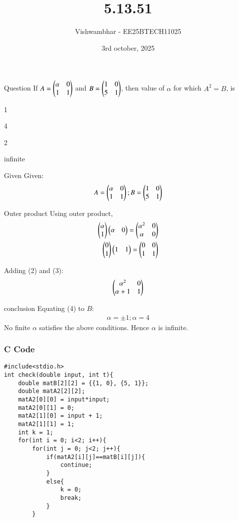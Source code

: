 \documentclass{beamer}
\title{5.13.51}
\date{3rd october, 2025}
\author{Vishwambhar - EE25BTECH11025}
\begin{document}
\frame{\titlepage}
\begin{frame}{Question}
If $A=\begin{pmatrix}\alpha&0\\1&1\end{pmatrix}$ and $B=\begin{pmatrix}1&0\\5&1\end{pmatrix}$, then value of $\alpha$ for which $A^2=B$, is
\begin{enumerate}
\begin{multicols}{2}
    \item 1
    \item 4
    \item 2
    \item infinite
\end{multicols}
\end{enumerate}\end{frame}

\begin{frame}{Given}
Given:
\begin{align}
    A = \begin{pmatrix}\alpha&0\\1&1\end{pmatrix};
    B = \begin{pmatrix}1&0\\5&1\end{pmatrix}
\end{align}
\end{frame}

\begin{frame}{Outer product}
Using outer product,
\begin{align}
    \begin{pmatrix}\alpha\\1\end{pmatrix}\begin{pmatrix}\alpha&0\end{pmatrix} = \begin{pmatrix}\alpha^2&0\\\alpha&0\end{pmatrix}\\
    \begin{pmatrix}0\\1\end{pmatrix}\begin{pmatrix}1&1\end{pmatrix} = \begin{pmatrix}0&0\\1&1\end{pmatrix}
\end{align}

Adding (2) and (3):
\begin{align}
    \begin{pmatrix}\alpha^2&0\\\alpha+1&1\end{pmatrix}
\end{align}
\end{frame}

\begin{frame}{conclusion}
Equating (4) to $B$:
\begin{align}
    \alpha = \pm1; \alpha = 4
\end{align}
No finite $\alpha$ satisfies the above conditions. Hence $\alpha$ is infinite.
\end{frame}

\begin{frame}[fragile]
    \frametitle{C Code}
    \begin{lstlisting}
#include<stdio.h>
int check(double input, int t){
    double matB[2][2] = {{1, 0}, {5, 1}};
    double matA2[2][2];
    matA2[0][0] = input*input;
    matA2[0][1] = 0;
    matA2[1][0] = input + 1;
    matA2[1][1] = 1;
    int k = 1;
    for(int i = 0; i<2; i++){
        for(int j = 0; j<2; j++){
            if(matA2[i][j]==matB[i][j]){
                continue;
            }
            else{
                k = 0;
                break;
            }
        }
    \end{lstlisting}
\end{frame}
\end{document}

